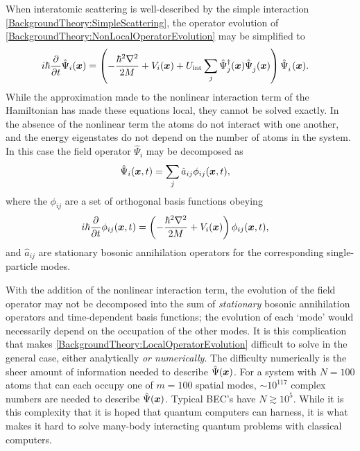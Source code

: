 When interatomic scattering is well-described by the simple interaction \eqref{BackgroundTheory:SimpleScattering}, the operator evolution of \eqref{BackgroundTheory:NonLocalOperatorEvolution} may be simplified to
\begin{align}
    i \hbar \frac{\partial}{\partial t} \hat{\Psi}_i(\vect{x}) &= \left( -\frac{\hbar^2 \nabla^2}{2 M} + V_{i}(\vect{x}) + U_\text{int} \sum_{j} \hat{\Psi}_j^\dagger(\vect{x}) \hat{\Psi}_j^{\phantom{\dagger}}(\vect{x}) \right) \hat{\Psi}_i^{\phantom{\dagger}}(\vect{x}). \label{BackgroundTheory:LocalOperatorEvolution}
\end{align}
While the approximation made to the nonlinear interaction term of the Hamiltonian has made these equations local, they cannot be solved exactly.  In the absence of the nonlinear term the atoms do not interact with one another, and the energy eigenstates do not depend on the number of atoms in the system.  In this case the field operator $\hat{\Psi}_i$ may be decomposed as
\begin{align}
    \hat{\Psi}_i(\bm{x}, t) &= \sum_j \hat{a}_{ij} \phi_{ij}(\bm{x}, t),
\end{align}
where the $\phi_{ij}$ are a set of orthogonal basis functions obeying
\begin{align}
    i \hbar \frac{\partial }{\partial t} \phi_{ij}(\bm{x}, t) &= \left( - \frac{\hbar^2 \nabla^2}{2M} + V_i(\bm{x}) \right) \phi_{ij}(\bm{x}, t),
\end{align}
and $\hat{a}_{ij}$ are stationary bosonic annihilation operators for the corresponding single-particle modes.  

With the addition of the nonlinear interaction term, the evolution of the field operator may not be decomposed into the sum of \emph{stationary} bosonic annihilation operators and time-dependent basis functions; the evolution of each `mode' would necessarily depend on the occupation of the other modes.  It is this complication that makes \eqref{BackgroundTheory:LocalOperatorEvolution} difficult to solve in the general case, either analytically \emph{or numerically}.  The difficulty numerically is the sheer amount of information needed to describe $\hat{\Psi}(\bm{x})$.  For a system with $N=100$ atoms that can each occupy one of $m = 100$ spatial modes, $\sim 10^{117}$ complex numbers are needed to describe $\hat{\Psi}(\bm{x})$.  Typical BEC's have $N \gtrsim 10^5$.  While it is this complexity that it is hoped that quantum computers can harness, it is what makes it hard to solve many-body interacting quantum problems with classical computers.

